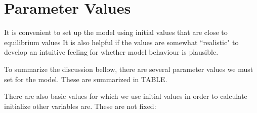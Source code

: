\chapter[Parameters]{Parameter Values} \label{appendix-paremeters}

It is convenient to set up the model using initial values that are close to equilibrium values It is also helpful if the values are somewhat ``realistic" to develop an intuitive feeling for whether model behaviour is plausible. 

To summarize the discussion bellow, there are several parameter values we must set for the model. These are summarized in TABLE.

\begin{description}
    \item
\end{description}

There are also  basic values for which we use initial values in order to calculate initialize other variables are. These are not fixed: %

